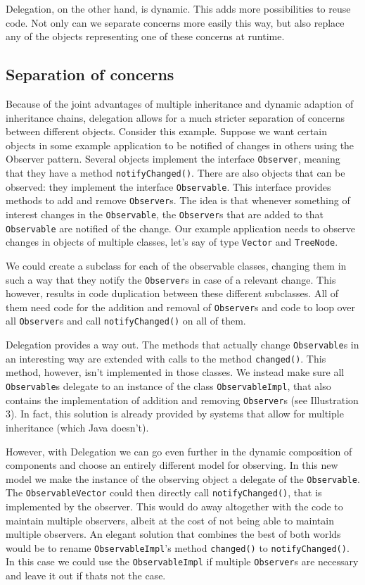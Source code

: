 \documentclass[a4paper,12pt]{book}
\begin{document}
Delegation, on the other hand, is dynamic. This adds more possibilities to reuse code. Not only can we separate concerns more easily this way, but also replace any of the objects representing one of these concerns at runtime. 

\subsection*{Separation of concerns}
Because of the joint advantages of multiple inheritance and dynamic adaption of inheritance chains, delegation allows for a much stricter separation of concerns between different objects. Consider this example. Suppose we want certain objects in some example application to be notified of changes in others using the Observer pattern. Several objects implement the interface \verb|Observer|, meaning that they have a method \verb|notifyChanged()|. There are also objects that can be observed: they implement the interface \verb|Observable|. This interface provides methods to add and remove \verb|Observer|s. The idea is that whenever something of interest changes in the \verb|Observable|, the \verb|Observer|s that are added to that \verb|Observable| are notified of the change. Our example application needs to observe changes in objects of multiple classes, let's say of type \verb|Vector| and \verb|TreeNode|.

We could create a subclass for each of the observable classes, changing them in such a way that they notify the \verb|Observer|s in case of a relevant change. This however, results in code duplication between these different subclasses. All of them need code for the addition and removal of \verb|Observer|s and code to loop over all \verb|Observer|s and call \verb|notifyChanged()| on all of them.

Delegation provides a way out. The methods that actually change \verb|Observable|s in an interesting way are extended with calls to the method \verb|changed()|. This method, however, isn't implemented in those classes. We instead make sure all \verb|Observable|s delegate to an instance of the class \verb|ObservableImpl|, that also contains the implementation of addition and removing \verb|Observer|s (see Illustration 3). In fact, this solution is already provided by systems that allow for multiple inheritance (which Java doesn't). 

However, with Delegation we can go even further in the dynamic composition of components and choose an entirely different model for observing. In this new model we make the instance of the observing object a delegate of the \verb|Observable|. The \verb|ObservableVector| could then directly call \verb|notifyChanged()|, that is implemented by the observer. This would do away altogether with the code to maintain multiple observers, albeit at the cost of not being able to maintain multiple observers. An elegant solution that combines the best of both worlds would be to rename \verb|ObservableImpl|'s method \verb|changed()| to \verb|notifyChanged()|. In this case we could use the \verb|ObservableImpl| if multiple \verb|Observer|s are necessary and leave it out if thats not the case.
 
\end{document}
